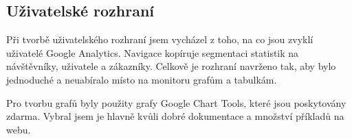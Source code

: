 \documentclass[bc,male,java,dept456]{diploma}						%
\begin{document}

\clearpage
\subsection{Uživatelské rozhraní}

Při tvorbě uživatelského rozhraní jsem vycházel z toho, na co jsou zvyklí uživatelé Google Analytics. Navigace kopíruje segmentaci statistik na návštěvníky, uživatele a zákazníky. Celkově je rozhraní navrženo tak, aby bylo jednoduché a neuabíralo místo na monitoru grafům a tabulkám.

Pro tvorbu grafů byly použity grafy Google Chart Tools\cite{chart_tools}, které jsou poskytovány zdarma. Vybral jsem je hlavně kvůli dobré dokumentace a množství příkladů na webu.
\end{document}
